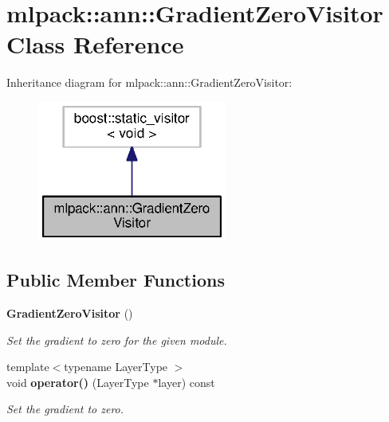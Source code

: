 \section{mlpack\+:\+:ann\+:\+:Gradient\+Zero\+Visitor Class Reference}
\label{classmlpack_1_1ann_1_1GradientZeroVisitor}


Inheritance diagram for mlpack\+:\+:ann\+:\+:Gradient\+Zero\+Visitor\+:
\nopagebreak
\begin{figure}[H]
\begin{center}
\leavevmode
\includegraphics[width=176pt]{classmlpack_1_1ann_1_1GradientZeroVisitor__inherit__graph}
\end{center}
\end{figure}
\subsection*{Public Member Functions}
\begin{DoxyCompactItemize}
\item 
{\bf Gradient\+Zero\+Visitor} ()
\begin{DoxyCompactList}\small\item\em Set the gradient to zero for the given module. \end{DoxyCompactList}\item 
{\footnotesize template$<$typename Layer\+Type $>$ }\\void {\bf operator()} (Layer\+Type $\ast$layer) const 
\begin{DoxyCompactList}\small\item\em Set the gradient to zero. \end{DoxyCompactList}\end{DoxyCompactItemize}
